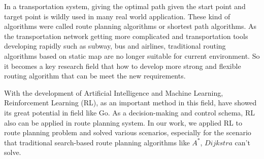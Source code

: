 \documentclass{standalone}
\begin{document}
\begin{englishabstract}

	In a transportation system, giving the optimal path given the start point and target point is wildly used in many real world application. These kind of algorithms were called route planning algorithms or shortest path algorithms. As the transportation network getting more complicated and transportation tools developing rapidly such as subway, bus and airlines, traditional routing algorithms based on static map are no longer suitable for current environment. So it becomes a key research field that how to develop more strong and flexible routing algorithm that can be meet the new requirements.

    With the development of Artificial Intelligence and Machine Learning, Reinforcement Learning (RL), as an important method in this field, have showed its great potential in field like Go. As a decision-making and control schema, RL also can be applied in route planning system. In our work, we applied RL to route planning problem and solved various scenarios, especially for the scenario that traditional search-based route planning algorithms like $A^*$, $Dijkstra$ can't solve.
    
  
\end{englishabstract}
\end{document}
